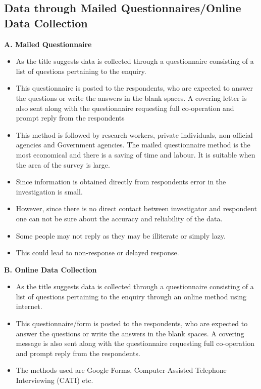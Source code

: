\documentclass[
10pt, %
a4paper, %
]{report}
\begin{document}
\subsection{Data through Mailed Questionnaires/Online Data Collection}
\textbf{A. Mailed Questionnaire}
\begin{itemize}
\item As the title suggests data is collected through a questionnaire consisting of a list of questions pertaining to the enquiry.
\item This questionnaire is posted to the respondents, who are expected to answer the questions or write the answers in the blank spaces. A covering letter is also sent along with the questionnaire requesting full co-operation and prompt reply from the respondents
\item This method is followed by research workers, private individuals, non-official agencies and Government agencies. The mailed questionnaire method is the most economical and there is a saving of time and labour. It is suitable when the area of the  survey is large.
\item Since information is obtained directly from respondents error in the investigation is small.
\item However, since there is no direct contact between investigator and respondent one can not be sure about the accuracy and reliability of the data.
\item Some people may not reply as they may be illiterate or simply lazy.
\item This could lead to non-response or delayed response.
\end{itemize}
\textbf{B. Online Data Collection}
\begin{itemize}
\item As the title suggests data is collected through a questionnaire consisting of a list of questions pertaining to the enquiry through an online method using internet.
\item This questionnaire/form is posted to the respondents, who are expected to answer the questions or write the answers in the blank spaces. A covering message is also sent along with the questionnaire requesting full co-operation and prompt reply from the respondents.
\item The methods used are Google Forms, Computer-Assisted Telephone Interviewing (CATI) etc.
\end{itemize}
\end{document}
